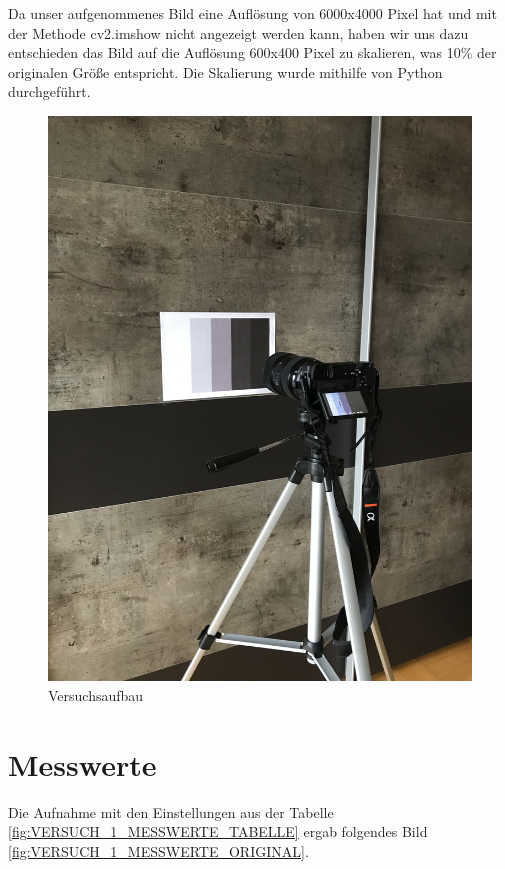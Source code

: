 \documentclass[12pt, oneside, a4paper, \docLanguage]{report}
\begin{document}
Da unser aufgenommenes Bild eine Auflösung von 6000x4000 Pixel hat und mit der Methode cv2.imshow nicht angezeigt werden kann, haben wir uns dazu entschieden das Bild auf die Auflösung 600x400 Pixel zu skalieren, was 10\% der originalen Größe entspricht. Die Skalierung wurde mithilfe von Python durchgeführt.

\begin{figure}[H]
	\centering\small
	\includegraphics[width=\textwidth, angle=-90, scale=0.8]{media/Versuchsaufbau_Grauwertkeil}
	\caption{Versuchsaufbau}
	\label{fig:VERSUCH_1_AUFBAU}
\end{figure}

\section{Messwerte}
\label{chap:VERSUCH_1_MESSWERTE}
Die Aufnahme mit den Einstellungen aus der Tabelle \ref{fig:VERSUCH_1_MESSWERTE_TABELLE} ergab folgendes Bild \ref{fig:VERSUCH_1_MESSWERTE_ORIGINAL}.
\end{document}
